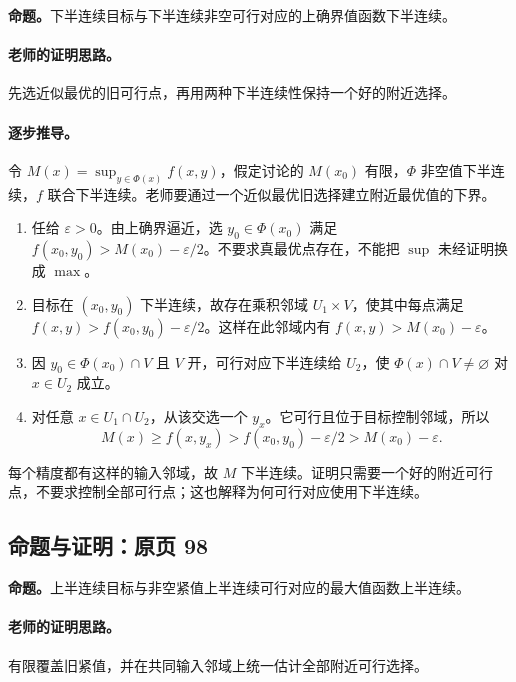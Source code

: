 \documentclass[11pt,a4paper]{article}
\newcommand{\eps}{\varepsilon}
\theoremstyle{definition}\newtheorem{definition}{定义}\newtheorem{example}{例}
\begin{document}
\textbf{命题。}下半连续目标与下半连续非空可行对应的上确界值函数下半连续。

\paragraph{老师的证明思路。}先选近似最优的旧可行点，再用两种下半连续性保持一个好的附近选择。

\paragraph{逐步推导。}
令 $M(x)=\sup_{y\in\Phi(x)} f(x,y)$，假定讨论的 $M(x_0)$ 有限，$\Phi$ 非空值下半连续，$f$ 联合下半连续。老师要通过一个近似最优旧选择建立附近最优值的下界。
\begin{enumerate}
\item 任给 $\eps>0$。由上确界逼近，选 $y_0\in\Phi(x_0)$ 满足 $f(x_0,y_0)>M(x_0)-\eps/2$。不要求真最优点存在，不能把 $\sup$ 未经证明换成 $\max$。
\item 目标在 $(x_0,y_0)$ 下半连续，故存在乘积邻域 $U_1\times V$，使其中每点满足 $f(x,y)>f(x_0,y_0)-\eps/2$。这样在此邻域内有 $f(x,y)>M(x_0)-\eps$。
\item 因 $y_0\in\Phi(x_0)\cap V$ 且 $V$ 开，可行对应下半连续给 $U_2$，使 $\Phi(x)\cap V\ne\varnothing$ 对 $x\in U_2$ 成立。
\item 对任意 $x\in U_1\cap U_2$，从该交选一个 $y_x$。它可行且位于目标控制邻域，所以
\[M(x)\ge f(x,y_x)>f(x_0,y_0)-\eps/2>M(x_0)-\eps.\]
\end{enumerate}
每个精度都有这样的输入邻域，故 $M$ 下半连续。证明只需要一个好的附近可行点，不要求控制全部可行点；这也解释为何可行对应使用下半连续。


\subsection{命题与证明：原页 98}

\textbf{命题。}上半连续目标与非空紧值上半连续可行对应的最大值函数上半连续。

\paragraph{老师的证明思路。}有限覆盖旧紧值，并在共同输入邻域上统一估计全部附近可行选择。
\end{document}
